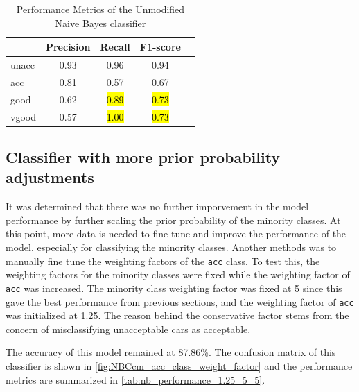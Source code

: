 \documentclass[a4paper]{article}
\begin{document}
\begin{table}[ht]
  \centering
  \caption{Performance Metrics of the Unmodified Naive Bayes classifier}
  \label{tab:nb_performance_10}
  \begin{tabular}{lcccc}
  \toprule
  \textbf{ } & \textbf{Precision} & \textbf{Recall} & \textbf{F1-score} \\
  \midrule
  unacc & 0.93 & 0.96 & 0.94\\
  acc  & 0.81 & 0.57 & 0.67\\
  good & 0.62 & \hl{0.89} & \hl{0.73}\\
  vgood & 0.57 & \hl{1.00} & \hl{0.73}\\
  \bottomrule
  \end{tabular}
\end{table}

\subsection{Classifier with more prior probability adjustments} 
It was determined that there was no further imporvement in the model performance by further scaling the prior probability of the minority classes. At this point, more data is needed to fine tune and improve the performance of the model, especially for classifying the minority classes. Another methods was to manually fine tune the weighting factors of the \lstinline{acc} class. To test this, the weighting factors for the minority classes were fixed while the weighting factor of \lstinline{acc} was increased. The minority class weighting factor was fixed at 5 since this gave the best performance from previous sections, and the weighting factor of \lstinline{acc} was initialized at 1.25. The reason behind the conservative factor stems from the concern of misclassifying unacceptable cars as acceptable.

The accuracy of this model remained at 87.86\%. The confusion matrix of this classifier is shown in \autoref{fig:NBCcm_acc_class_weight_factor} and the performance metrics are summarized in \autoref{tab:nb_performance_1.25_5_5}.
\end{document}
